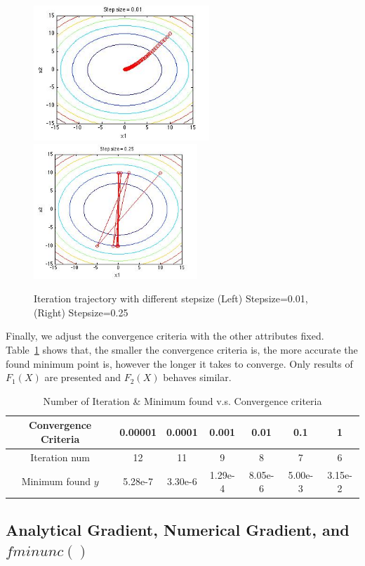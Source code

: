 \begin{figure}[h]
 \centering
\includegraphics[height=2in]{figures/p1_QualStepSmall} 
\includegraphics[height=2in]{figures/p1_QualStepBig} 
    \caption{Iteration trajectory with different stepsize (Left) Stepsize=0.01, (Right) Stepsize=0.25}
    \label{fig:ItrStep}
\end{figure}

Finally, we adjust the convergence criteria with the other attributes fixed. Table~\ref{tab:ItrConve} shows that, the smaller the convergence criteria is, the more accurate the found minimum point is, however the longer it takes to converge. Only results of $F_1(X)$ are presented and $F_2(X)$ behaves similar.
\begin{table}[h]
\centering
\caption{Number of Iteration \& Minimum found v.s. Convergence criteria} \label{tab:ItrConve} 
\begin{tabular}{ | c | c | c | c | c | c | c |  }
\hline 
Convergence Criteria & 0.00001 & 0.0001 & 0.001 & 0.01 & 0.1 & 1 \\
\hline 
Iteration num & 12 & 11 & 9 & 8 & 7 & 6  \\
\hline
Minimum found $y$ & 5.28e-7 & 3.30e-6 & 1.29e-4 & 8.05e-6 & 5.00e-3 & 3.15e-2\\
\hline
\end{tabular}
\end{table}


\subsection{Analytical Gradient, Numerical Gradient, and $fminunc()$ }

